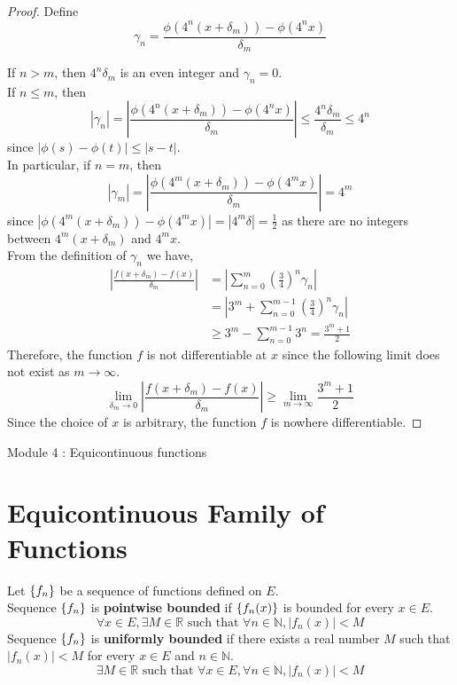\begin{proof}
	Define
	\[\gamma_n = \frac{\phi(4^n(x+\delta_m)) - \phi(4^n x)}{\delta_m} \]

	If $n > m$, then $4^n \delta_m$ is an even integer and $\gamma_n = 0$.\\
	If $n \le m$, then 
	\[ |\gamma_n| = \left|\frac{\phi(4^n(x+\delta_m)) - \phi(4^n x)}{\delta_m} \right| \le \frac{4^n \delta_m }{\delta_m} \le 4^n \]
	since $|\phi(s)-\phi(t)| \le |s-t|$.\\
	In particular, if $n = m$, then
	\[ |\gamma_m| = \left| \frac{\phi(4^m(x+\delta_m))-\phi(4^m x)}{\delta_m} \right| = 4^m \]
	since $|\phi(4^m (x+\delta_m)) - \phi(4^m x)| = |4^m \delta| = \frac{1}{2}$ as there are no integers between $4^m(x+\delta_m)$ and $4^m x$.\\

	From the definition of $\gamma_n$ we have,
	\begin{align*}
	 \left| \frac{f(x+\delta_m) - f(x)}{\delta_m} \right| 
		& = \left| \sum_{n = 0}^m \left( \frac{3}{4} \right)^n \gamma_n \right| \\
		& = \left| 3^m + \sum_{n = 0}^{m-1} \left( \frac{3}{4} \right)^n \gamma_n \right| \\
		& \ge 3^m - \sum_{n = 0}^{m-1} 3^n = \frac{3^m+1}{2}
	\end{align*}
	Therefore, the function $f$ is not differentiable at $x$ since the following limit does not exist as $m \to \infty$.
	\[ \lim_{\delta_m \to 0} \left| \frac{f(x+\delta_m) - f(x)}{\delta_m} \right| \ge \lim_{m \to \infty} \frac{3^m+1}{2} \]
	Since the choice of $x$ is arbitrary, the function $f$ is nowhere differentiable.
\end{proof}

\pagebreak

{\Large Module 4 : Equicontinuous functions}
\section{Equicontinuous Family of Functions}
\begin{definition}
	Let $\left\{f_n\right\}$ be a sequence of functions defined on $E$.\\
	Sequence $\left\{f_n\right\}$ is \textbf{pointwise bounded} if $\left\{f_n(x)\right\}$ is bounded for every $x \in E$.
	\[ \forall x \in E, \exists M \in \mathbb{R} \text{ such that } \forall n \in \mathbb{N}, |f_n(x)| < M \]
	Sequence $\left\{f_n\right\}$ is \textbf{uniformly bounded} if there exists a real number $M$ such that $|f_n(x)| < M$ for every $x \in E$ and $n \in \mathbb{N}$.
	\[ \exists M \in \mathbb{R} \text{ such that } \forall x \in E, \forall n \in \mathbb{N}, |f_n(x)| < M \]
\end{definition}
